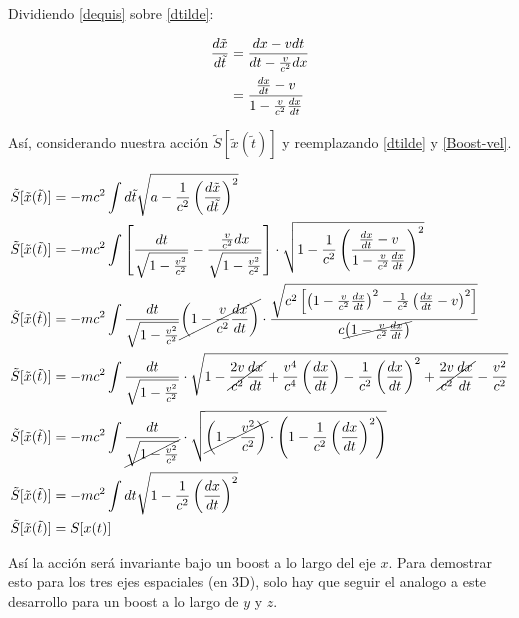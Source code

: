 \documentclass[../main_ej.tex]{subfiles}
\begin{document}
Dividiendo \eqref{dequis} sobre \eqref{dtilde}: 

\begin{align}
  \frac{d\tilde{x}}{d\tilde{t}} &= \frac{dx -vdt}{dt - \frac{v}{c^2}dx} \notag \\
  &= \frac{\frac{dx}{dt}-v}{1 - \frac{v}{c^2}\frac{dx}{dt}} \label{Boost-vel}
\end{align}

Así, considerando nuestra acción  $\tilde{S}[\tilde{x}(\tilde{t})]$ y reemplazando \eqref{dtilde} y \eqref{Boost-vel}.

\begin{align*}
  \tilde{S}[\tilde{x}(\tilde{t})] &= -mc^2 \int d\tilde{t} \sqrt{a - \frac{1}{c^2}\left(\frac{d\tilde{x}}{d\tilde{t}}\right)^2} \\
  \tilde{S}[\tilde{x}(\tilde{t})] &= -mc^2 \int \left[ \frac{dt}{\sqrt{1 - \frac{v^2}{c^2}}} - \frac{\frac{v}{c^2}dx}{\sqrt{1- \frac{v^2}{c^2}}} \right] \cdot \sqrt{1 - \frac{1}{c^2}\left(\frac{ \frac{dx}{dt}- v}{1 - \frac{v}{c^2}\frac{dx}{dt}}\right)^2} \\
  \tilde{S}[\tilde{x}(\tilde{t})] &= -mc^2 \int \frac{dt}{\sqrt{1 - \frac{v^2}{c^2}}} \cancel{\left( 1 - \frac{v}{c^2} \frac{dx}{dt}\right)} \cdot \frac{\sqrt{c^2 \left[ \left(1 -\frac{v}{c^2}\frac{dx}{dt}\right)^2 - \frac{1}{c^2}\left(\frac{dx}{dt}-v\right)^2 \right]}}{c \cancel{\left( 1 - \frac{v}{c^2}\frac{dx}{dt} \right)}} \\
  \tilde{S}[\tilde{x}(\tilde{t})] &= -mc^2 \int \frac{dt}{\sqrt{1 - \frac{v^2}{c^2}}} \cdot \sqrt{1 - \cancel{\frac{2v}{c^2}\frac{dx}{dt}} + \frac{v^4}{c^4} \left(\frac{dx}{dt}\right) - \frac{1}{c^2}\left(\frac{dx}{dt}\right)^2 + \cancel{\frac{2v}{c^2}\frac{dx}{dt}} -\frac{v^2}{c^2}} \\
  \tilde{S}[\tilde{x}(\tilde{t})] &= -mc^2 \int \frac{dt}{\cancel{\sqrt{1 - \frac{v^2}{c^2}}}} \cdot \sqrt{\cancel{\left( 1 - \frac{v^2}{c^2} \right)} \cdot \left( 1 - \frac{1}{c^2}\left( \frac{dx}{dt} \right)^2 \right)} \\
  \tilde{S}[\tilde{x}(\tilde{t})] &= -mc^2\int dt \sqrt{1 - \frac{1}{c^2}\left( \frac{dx}{dt} \right)^2} \\
  \tilde{S}[\tilde{x}(\tilde{t})] &= S[x(t)]\\
\end{align*}

Así la acción será invariante bajo un boost a lo largo del eje $x$. Para demostrar esto para los tres ejes espaciales (en 3D), solo hay que seguir el analogo a este desarrollo para un boost a lo largo de $y$ y $z$.
\end{document}
